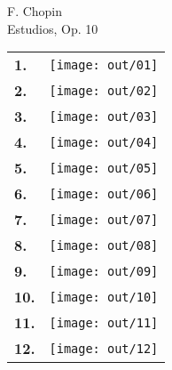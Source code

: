 \documentclass[a4paper,13pt,oneside,headinclude,titlepage]{article} %
\newcommand{\imgw}{0.67}
\newlength{\colw}
\newcommand{\tn}{\tabularnewline}
\begin{document}
\begin{center}
\vfill
{\huge F. Chopin}\\[1ex]
{\huge Estudios, Op. 10}\\[1ex]
\vfill
\begin{tabular}{>{\bfseries}m{2ex}m{\colw}}
1.&\texttt{[image: out/01]}\tn
2.&\texttt{[image: out/02]}\tn
3.&\texttt{[image: out/03]}\tn
4.&\texttt{[image: out/04]}\tn
5.&\texttt{[image: out/05]}\tn
6.&\texttt{[image: out/06]}\tn
7.&\texttt{[image: out/07]}\tn
8.&\texttt{[image: out/08]}\tn
9.&\texttt{[image: out/09]}\tn
10.&\texttt{[image: out/10]}\tn
11.&\texttt{[image: out/11]}\tn
12.&\texttt{[image: out/12]}\tn
\end{tabular}
\end{center}
\vfill
\end{document}
